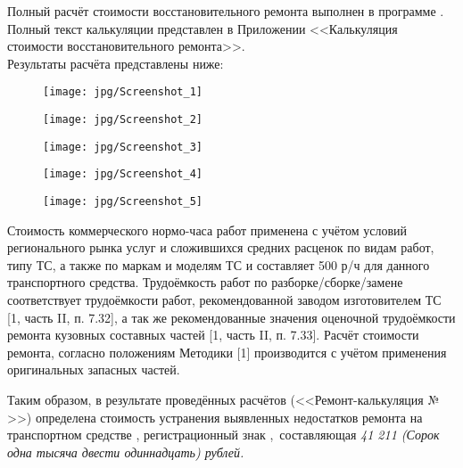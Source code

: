 {\par Полный расчёт стоимости восстановительного ремонта выполнен в программе \auda.\\
Полный текст калькуляции представлен в Приложении  <<Калькуляция стоимости восстановительного ремонта>>.\\ 
\indent Результаты расчёта представлены ниже:
%
\begin{figure}[H]
	\centering
	\texttt{[image: jpg/Screenshot\_1]}
\end{figure}
\begin{figure}[H]
	\centering
	\texttt{[image: jpg/Screenshot\_2]}
\end{figure}
\begin{figure}[H]
	\centering
	\texttt{[image: jpg/Screenshot\_3]}
\end{figure}
\begin{figure}[H]
	\centering
	\texttt{[image: jpg/Screenshot\_4]}
\end{figure}
\begin{figure}[H]
	\centering
	\texttt{[image: jpg/Screenshot\_5]}
\end{figure}
\medskip
\renewcommand\baselinestretch{1.2}\small\normalsize
Стоимость коммерческого нормо-часа работ применена  с учётом условий регионального рынка услуг и сложившихся средних расценок по видам работ, типу ТС, а также по маркам и моделям ТС  и   составляет 500 р/ч для данного транспортного средства. Трудоёмкость работ по разборке/сборке/замене  соответствует трудоёмкости работ, рекомендованной заводом изготовителем ТС [1, часть II, п. 7.32], а так же рекомендованные значения оценочной трудоёмкости ремонта кузовных составных частей [1, часть II, п. 7.33]. Расчёт стоимости ремонта, согласно положениям Методики [1] производится с учётом  применения оригинальных запасных частей. %
%
\par Таким образом, в результате проведённых расчётов (<<Ремонт-калькуляция № \NomerDoc>>) определена стоимость устранения выявленных недостатков ремонта на транспортном средстве  , регистрационный  знак ,\, составляющая  \textit{41 211 (Сорок одна тысяча двести одиннадцать) рублей.}
 

}
